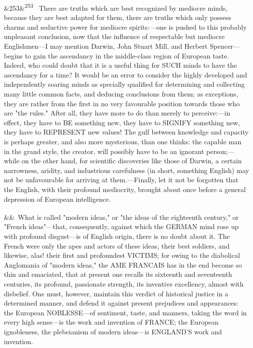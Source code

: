 \documentclass[12pt]{article}
\newcommand{\para}[1][]{\par\noindent\ifx&#1&\else\textsuperscript{\footnotesize #1}~\fi}
\begin{document}
\para[253] There are truths which are best recognized by mediocre minds, because they are best adapted for them, there are truths which only possess charms and seductive power for mediocre spirits:---one is pushed to this probably unpleasant conclusion, now that the influence of respectable but mediocre Englishmen---I may mention Darwin, John Stuart Mill, and Herbert Spencer---begins to gain the ascendancy in the middle-class region of European taste. Indeed, who could doubt that it is a useful thing for SUCH minds to have the ascendancy for a time? It would be an error to consider the highly developed and independently soaring minds as specially qualified for determining and collecting many little common facts, and deducing conclusions from them; as exceptions, they are rather from the first in no very favourable position towards those who are "the rules." After all, they have more to do than merely to perceive:---in effect, they have to BE something new, they have to SIGNIFY something new, they have to REPRESENT new values! The gulf between knowledge and capacity is perhaps greater, and also more mysterious, than one thinks: the capable man in the grand style, the creator, will possibly have to be an ignorant person;---while on the other hand, for scientific discoveries like those of Darwin, a certain narrowness, aridity, and industrious carefulness (in short, something English) may not be unfavourable for arriving at them.---Finally, let it not be forgotten that the English, with their profound mediocrity, brought about once before a general depression of European intelligence.

\para What is called "modern ideas," or "the ideas of the eighteenth century," or "French ideas"---that, consequently, against which the GERMAN mind rose up with profound disgust---is of English origin, there is no doubt about it. The French were only the apes and actors of these ideas, their best soldiers, and likewise, alas! their first and profoundest VICTIMS; for owing to the diabolical Anglomania of "modern ideas," the AME FRANCAIS has in the end become so thin and emaciated, that at present one recalls its sixteenth and seventeenth centuries, its profound, passionate strength, its inventive excellency, almost with disbelief. One must, however, maintain this verdict of historical justice in a determined manner, and defend it against present prejudices and appearances: the European NOBLESSE---of sentiment, taste, and manners, taking the word in every high sense---is the work and invention of FRANCE; the European ignobleness, the plebeianism of modern ideas---is ENGLAND'S work and invention.
\end{document}
